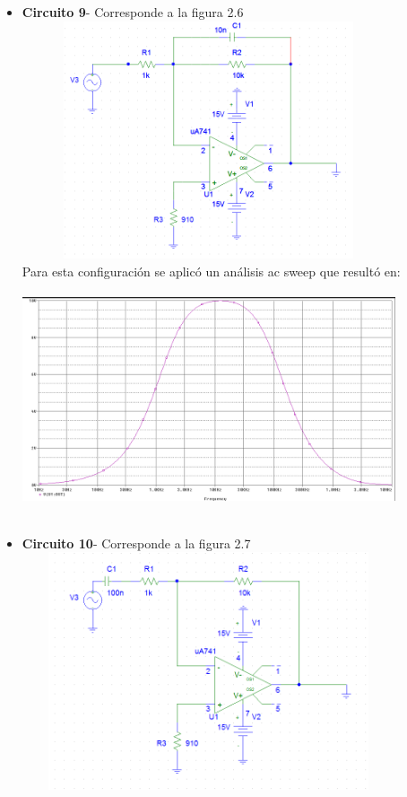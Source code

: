 \documentclass[12pt]{article}
\begin{document}
\begin{itemize}
		\newpage
		
		\item \textbf{Circuito 9}- Corresponde a la figura 2.6\\
		
		\includegraphics[width=11cm,height=7cm]{Img/opam_ua741_pasa_bajo_act}\\
		
		\noindent Para esta configuración se aplicó un análisis ac sweep que resultó en:\\
		
		\includegraphics[width=11cm,height=7cm]{Img/filtro_pasa_alto_activo}\\
		
		\newpage
		
		\item \textbf{Circuito 10}- Corresponde a la figura 2.7\\
		
		\includegraphics[width=11cm,height=7cm]{Img/opam_ua741_pasa_alto_act}\\
		

\end{itemize}
\end{document}
